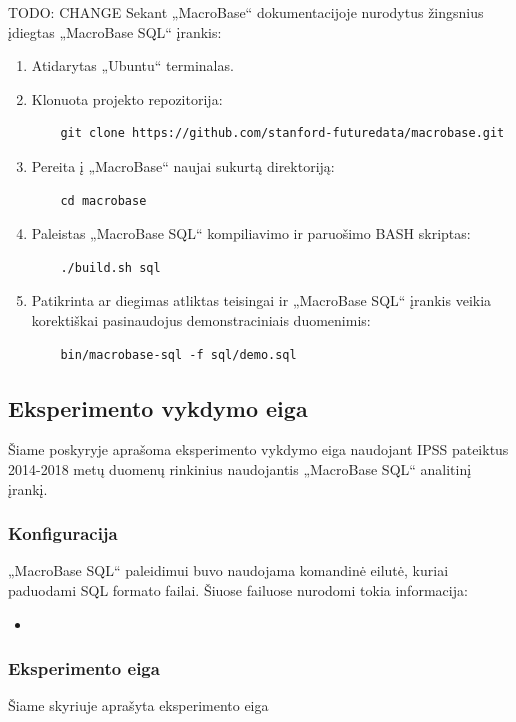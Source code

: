 \documentclass{VUMIFPSbakalaurinis}
\begin{document}
TODO: CHANGE
Sekant „MacroBase“ dokumentacijoje nurodytus žingsnius įdiegtas „MacroBase SQL“ įrankis:
\begin{enumerate}
	\item Atidarytas „Ubuntu“ terminalas.
	\item Klonuota projekto repozitorija:
	\begin{verbatim}
	git clone https://github.com/stanford-futuredata/macrobase.git
	\end{verbatim}
	\item Pereita į „MacroBase“ naujai sukurtą direktoriją:
	\begin{verbatim}
	cd macrobase
	\end{verbatim}
	\item Paleistas „MacroBase SQL“ kompiliavimo ir paruošimo BASH skriptas:
	\begin{verbatim}
	./build.sh sql
	\end{verbatim}
	\item Patikrinta ar diegimas atliktas teisingai ir „MacroBase SQL“ įrankis veikia korektiškai pasinaudojus demonstraciniais duomenimis:
	\begin{verbatim}
	bin/macrobase-sql -f sql/demo.sql
	\end{verbatim}
\end{enumerate}

\subsection{Eksperimento vykdymo eiga}
Šiame poskyryje aprašoma eksperimento vykdymo eiga naudojant IPSS pateiktus 2014-2018 metų duomenų rinkinius naudojantis „MacroBase SQL“ analitinį įrankį.

\subsubsection{Konfiguracija}
„MacroBase SQL“ paleidimui buvo naudojama komandinė eilutė, kuriai paduodami SQL formato failai. Šiuose failuose nurodomi tokia informacija:
\begin{itemize}
	\item 
\end{itemize}

\subsubsection{Eksperimento eiga}
Šiame skyriuje aprašyta eksperimento eiga 
\end{document}
